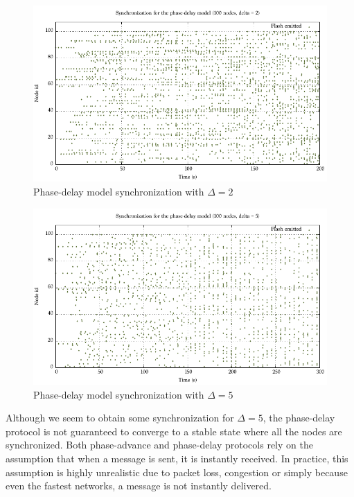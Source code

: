 \documentclass[a4paper, 11pt]{article}
\theoremstyle{plain}
\theoremstyle{definition}
\begin{document}
     \begin{figure}[h]
       \centering
       \includegraphics[scale=0.8]{../Plots/Firefly-pd-100nodes-2-4.pdf}
       \caption{Phase-delay model synchronization with $\Delta = 2$}
       \label{fig:pd-sync-d2}
     \end{figure}

      \begin{figure}[h]
       \centering
       \includegraphics[scale=0.8]{../Plots/Firefly-pd-100nodes-5-5.pdf}
       \caption{Phase-delay model synchronization with $\Delta = 5$}
       \label{fig:pd-sync-d5}
     \end{figure}
     
     Although we seem to obtain some synchronization for $\Delta = 5$, the phase-delay protocol is not
     guaranteed to converge to a stable state where all the nodes are synchronized. Both phase-advance and
     phase-delay protocols rely on the assumption that when a message is sent, it is instantly received. In
     practice, this assumption is highly unrealistic due to packet loss, congestion or simply because even the
     fastest networks, a message is not instantly delivered.
\end{document}
